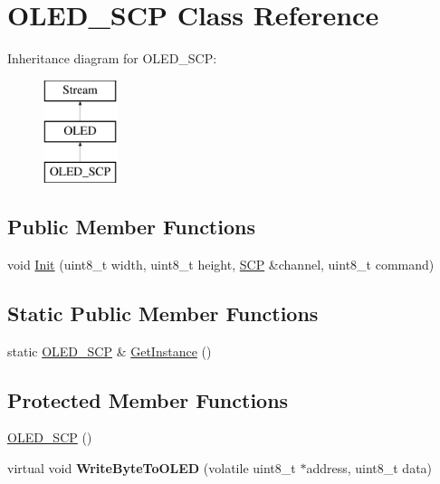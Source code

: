 \hypertarget{class_o_l_e_d___s_c_p}{}\section{O\+L\+E\+D\+\_\+\+S\+CP Class Reference}
\label{class_o_l_e_d___s_c_p}
Inheritance diagram for O\+L\+E\+D\+\_\+\+S\+CP\+:\begin{figure}[H]
\begin{center}
\leavevmode
\includegraphics[height=3.000000cm]{class_o_l_e_d___s_c_p}
\end{center}
\end{figure}
\subsection*{Public Member Functions}
\begin{DoxyCompactItemize}
\item 
void \hyperlink{class_o_l_e_d___s_c_p_a7747b903ab94fe91bad520a3f0919e7a}{Init} (uint8\+\_\+t width, uint8\+\_\+t height, \hyperlink{class_s_c_p}{S\+CP} \&channel, uint8\+\_\+t command)
\end{DoxyCompactItemize}
\subsection*{Static Public Member Functions}
\begin{DoxyCompactItemize}
\item 
static \hyperlink{class_o_l_e_d___s_c_p}{O\+L\+E\+D\+\_\+\+S\+CP} \& \hyperlink{class_o_l_e_d___s_c_p_a25644abcadcbb50816128fb31b7af83b}{Get\+Instance} ()
\end{DoxyCompactItemize}
\subsection*{Protected Member Functions}
\begin{DoxyCompactItemize}
\item 
\hyperlink{class_o_l_e_d___s_c_p_a8a52dd583b6f4bdf479204c31c99b4b7}{O\+L\+E\+D\+\_\+\+S\+CP} ()
\item 
\hypertarget{class_o_l_e_d___s_c_p_a5488fa5865fd8c0e83eb3c8ff7a216cf}{}\label{class_o_l_e_d___s_c_p_a5488fa5865fd8c0e83eb3c8ff7a216cf} 
virtual void {\bfseries Write\+Byte\+To\+O\+L\+ED} (volatile uint8\+\_\+t $\ast$address, uint8\+\_\+t data)
\end{DoxyCompactItemize}
